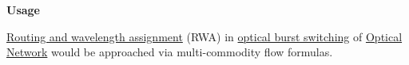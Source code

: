 {%
%
%
%
%
%
%
%
%

\hypertarget{usage}{%
\textbf{Usage}\label{usage}}

\href{Routing_and_wavelength_assignment}{Routing and wavelength
assignment} (RWA) in \href{optical_burst_switching}{optical burst
switching} of \href{SONET}{Optical Network} would be approached via
multi-commodity flow formulas.


}

